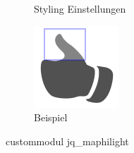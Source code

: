 \begin{figure}[H]
\begin{subfigure}[b]{0.4\textwidth}
		\caption[]{Styling Einstellungen}
		\label{fig:config_maphilight_style}
	\end{subfigure}
	\begin{subfigure}[b]{0.2\textwidth}
		\centering
		\includegraphics[width=0.95\linewidth]{images/example_maphighlight}
		\caption[]{Beispiel}
		\label{fig:example_maphilight}
	\end{subfigure}
	\caption{\gls{custommodul} jq\_maphilight}
	\label{fig:config_maphilight}
\end{figure}

